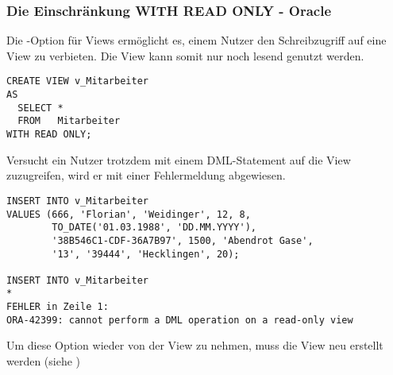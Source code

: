         \subsubsection{Die Einschr\"ankung WITH READ ONLY - Oracle}
          \label{READONLY}
          Die -Option f\"ur Views erm\"oglicht es, einem Nutzer den Schreibzugriff auf eine View zu verbieten. Die View kann somit nur noch lesend genutzt werden.
          \begin{lstlisting}[language=oracle_sql,caption={Eine View mit mit READ ONLY Option erstellen},label=sql08_38]
CREATE VIEW v_Mitarbeiter
AS
  SELECT *
  FROM   Mitarbeiter
WITH READ ONLY;
          \end{lstlisting}
          Versucht ein Nutzer trotzdem mit einem DML-Statement auf die View zuzugreifen, wird er mit einer Fehlermeldung abgewiesen.
\clearpage
          \begin{lstlisting}[language=oracle_sql,caption={Daten in eine READ ONLY View einf\"ugen schl\"agt fehl},label=sql08_39]
INSERT INTO v_Mitarbeiter
VALUES (666, 'Florian', 'Weidinger', 12, 8,
        TO_DATE('01.03.1988', 'DD.MM.YYYY'),
        '38B546C1-CDF-36A7B97', 1500, 'Abendrot Gase',
        '13', '39444', 'Hecklingen', 20);

INSERT INTO v_Mitarbeiter
*
FEHLER in Zeile 1:
ORA-42399: cannot perform a DML operation on a read-only view
          \end{lstlisting}
          Um diese Option wieder von der View zu nehmen, muss die View neu erstellt werden (siehe )
